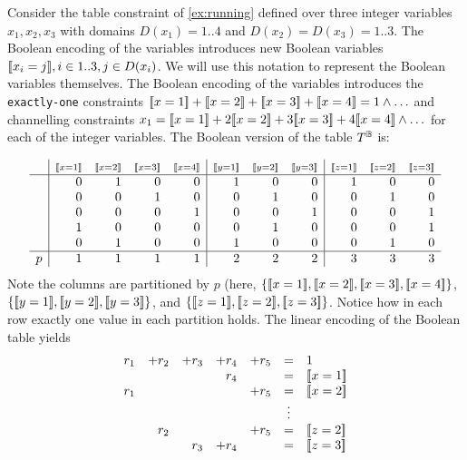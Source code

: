 \documentclass[a4paper,UKenglish,cleveref,autoref,thm-restate]{lipics-v2021}
\begin{document}
\begin{example}
\label{ex:binary}
\label{ex:table}
Consider the table constraint of \cref{ex:running}
defined over three integer variables $x_1, x_2, x_3$ with domains 
$D(x_1) = 1..4$ and $D(x_2)= D(x_3) = 1..3$.
The Boolean encoding of the variables introduces new Boolean variables $[\![x_i = j]\!], i \in 1..3, j \in D(x_i)$.
We will use this notation to represent the Boolean variables themselves.
The Boolean encoding of the variables introduces the \texttt{exactly-one} constraints 
$\be{1}{1} + \be{1}{2} + \be{1}{3} + \be{1}{4} = 1 \land \ldots$
and channelling constraints $x_1 = \be{1}{1} + 2 \be{1}{2} + 3 \be{1}{3} + 4\be{1}{4} \land \ldots$
for each of the integer variables.
The Boolean version of the table $T^{\mathbb{B}}{}$  is:

   \begin{equation*}
   \begin{array}{l|rrrr|rrr|rrr}
&  {\besml{1}{1}} & \besml{1}{2} & \besml{1}{3} & \besml{1}{4} & \besml{2}{1} & \besml{2}{2} & \besml{2}{3} & \besml{3}{1} & \besml{3}{2} & \besml{3}{3} \\ \hline
&   0   & 1   & 0   & 0   & 1   & 0   & 0   & 1   & 0   & 0 \\
&   0   & 0   & 1   & 0   & 0   & 1   & 0   & 0   & 1   & 0 \\
&   0   & 0   & 0   & 1   & 0   & 0   & 1   & 0   & 0   & 1 \\
&   1   & 0   & 0   & 0   & 0   & 1   & 0   & 0   & 0   & 1 \\
&   0   & 1   & 0   & 0   & 1   & 0   & 0   & 0   & 1   & 0 \\ \hline
p& 1   & 1   & 1   & 1   & 2   & 2   & 2   & 3   & 3   & 3    \\
   \end{array}
   \end{equation*}
   Note the columns are partitioned by $p$ (here, $\{\be{1}{1}, \be{1}{2}, \be{1}{3}, \be{1}{4}\}$, $\{\be{2}{1}, \be{2}{2}, \be{2}{3}\}$, and $\{\be{3}{1},\be{3}{2},\be{3}{3}\}$.
Notice how in each row exactly one value in each partition holds.   
The linear encoding of the Boolean table yields
\begin{equation*}
\begin{array}{rrrrrcl}
r_1 &+ r_2& + r_3& + r_4& + r_5 &= &1 \\
&&&r_4 && = & \be{1}{1} \\
r_1 &&&& +r_5 & = &\be{1}{2} \\
&&&&& \vdots & \\
& r_2 &&& +r_5 & = & \be{3}{2} \\
&& r_3 & + r_4 && = & \be{3}{3}
\end{array}
\end{equation*}
\end{example}
\end{document}
